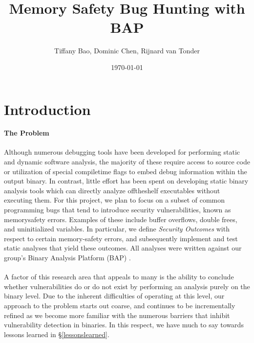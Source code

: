 \documentclass[letterpaper,11pt]{article}
\begin{document}
\date{\today}

\title{\Large \bf Memory Safety Bug Hunting with BAP}

\author{Tiffany Bao, Dominic Chen, Rijnard van Tonder}

\maketitle

\section{Introduction}
\label{intro}

\paragraph{The Problem}

\paragraph{}
Although numerous debugging tools have been developed for performing static and
dynamic software analysis, the majority of these require access to source
code or utilization of special compile­time flags to embed debug information
within the output binary. In contrast, little effort has been spent on
developing static binary analysis tools which can directly analyze
off­the­shelf executables without executing them. For this project, we plan to
focus on a subset of common programming bugs that tend to introduce security
vulnerabilities, known as memory­safety errors. Examples of these include
buffer overflows, double frees, and uninitialized variables. In particular, we
define \emph{Security Outcomes} with respect to certain memory-safety errors,
and subsequently implement and test static analyses that yield these outcomes.
All analyses were written against our group's Binary Analysis Platform
(BAP) \cite{bap, brumley2011bap}.

\paragraph{}
A factor of this research area that appeals to many is the ability to
conclude whether vulnerabilities do or do not exist by performing
an analysis purely on the binary level. Due to the inherent difficulties
of operating at this level, %
our approach to the problem starts out coarse, and continues to be
incrementally refined as we become more familiar with the numerous
barriers that inhibit vulnerability detection in binaries. In this respect,
we have much to say towards lessons learned in \S\ref{lessonslearned}.
\end{document}
